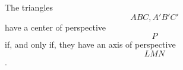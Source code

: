 The triangles $$ABC, A'B'C'$$ have a center of perspective $$P$$ if, and only if, they have an axis of perspective $$LMN$$.
